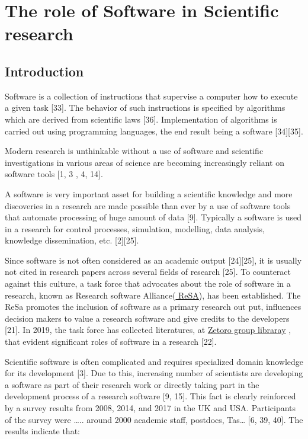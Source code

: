 \section{The role of Software in Scientific research}
\subsection{Introduction}
Software is a collection of instructions that supervise a computer how to execute a given task [33]. The behavior of such instructions is specified by algorithms which are derived from scientific laws [36].  Implementation of algorithms is carried out using programming languages, the end result being a software [34][35]. 

Modern research is unthinkable without a use of software and scientific investigations in various areas of science are becoming increasingly reliant on software tools [1, 3 , 4, 14]. 

A software is very important asset for building a scientific knowledge and more discoveries in a research are made possible than ever by a use of software tools that automate processing of huge amount of data [9]. Typically a software is used in a research for control processes, simulation, modelling, data analysis, knowledge dissemination, etc. [2][25].

Since software is not often considered as an academic output [24][25], it is usually not cited in research papers across several fields of research [25]. To counteract against this culture, a task force that advocates about the role of software in a research, known as Research software Alliance(\href{https://www.researchsoft.org/}{ ReSA}), has been established. The ReSa promotes the inclusion of software as a primary research out put, influences decision makers to value a research software and give credits to the developers [21]. In 2019, the task force has collected literatures, at \href{https://www.zotero.org/groups/2400609/resa/library}{Zetoro group libraray} , that evident significant roles of software in a research [22].  

Scientific software is often complicated and requires specialized domain knowledge for its development [3]. Due to this, increasing number of scientists are developing a software as part of their research work or directly taking part in the development process of a research software [9, 15]. This fact is clearly reinforced by a  survey results  from 2008, 2014, and 2017  in the UK and USA. Participants of the survey were ….. around 2000 academic staff, postdocs, Tas… [6, 39, 40].  The results indicate that:

